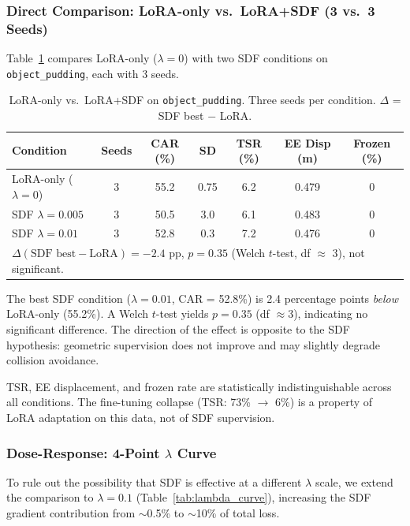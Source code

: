 \documentclass[10pt,letterpaper]{article}
\begin{document}
\subsubsection{Direct Comparison: LoRA-only vs.\ LoRA+SDF (3 vs.\ 3 Seeds)}
\label{sec:3v3}

Table~\ref{tab:3v3} compares LoRA-only ($\lambda = 0$) with two SDF conditions on \texttt{object\_pudding}, each with 3 seeds.

\begin{table}[t]
\centering
\caption{LoRA-only vs.\ LoRA+SDF on \texttt{object\_pudding}. Three seeds per condition. $\Delta$ = SDF best $-$ LoRA.}
\label{tab:3v3}
\begin{tabular}{lcccccc}
\toprule
Condition & Seeds & CAR (\%) & SD & TSR (\%) & EE Disp (m) & Frozen (\%) \\
\midrule
LoRA-only ($\lambda{=}0$) & 3 & 55.2 & 0.75 & 6.2 & 0.479 & 0 \\
SDF $\lambda{=}0.005$ & 3 & 50.5 & 3.0 & 6.1 & 0.483 & 0 \\
SDF $\lambda{=}0.01$ & 3 & 52.8 & 0.3 & 7.2 & 0.476 & 0 \\
\bottomrule
\multicolumn{7}{l}{\footnotesize $\Delta(\text{SDF best} - \text{LoRA}) = -2.4$ pp, $p = 0.35$ (Welch $t$-test, df $\approx$ 3), not significant.}
\end{tabular}
\end{table}

The best SDF condition ($\lambda = 0.01$, CAR = 52.8\%) is 2.4 percentage points \emph{below} LoRA-only (55.2\%). A Welch $t$-test yields $p = 0.35$ (df $\approx 3$), indicating no significant difference. The direction of the effect is opposite to the SDF hypothesis: geometric supervision does not improve and may slightly degrade collision avoidance.

TSR, EE displacement, and frozen rate are statistically indistinguishable across all conditions. The fine-tuning collapse (TSR: 73\% $\to$ 6\%) is a property of LoRA adaptation on this data, not of SDF supervision.

\subsubsection{Dose-Response: 4-Point $\lambda$ Curve}
\label{sec:dose_response}

To rule out the possibility that SDF is effective at a different $\lambda$ scale, we extend the comparison to $\lambda = 0.1$ (Table~\ref{tab:lambda_curve}), increasing the SDF gradient contribution from $\sim$0.5\% to $\sim$10\% of total loss.
\end{document}
